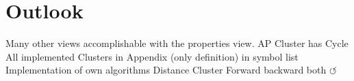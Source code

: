 \documentclass[preview]{standalone}
\begin{document}
\section{Outlook}
Many other views accomplishable with the properties view.
AP Cluster has Cycle
All implemented Clusters in Appendix (only definition)
\intmodn {} \natnums in symbol list
Implementation of own algorithms
Distance Cluster Forward backward both
$\circlearrowleft$
\end{document}
